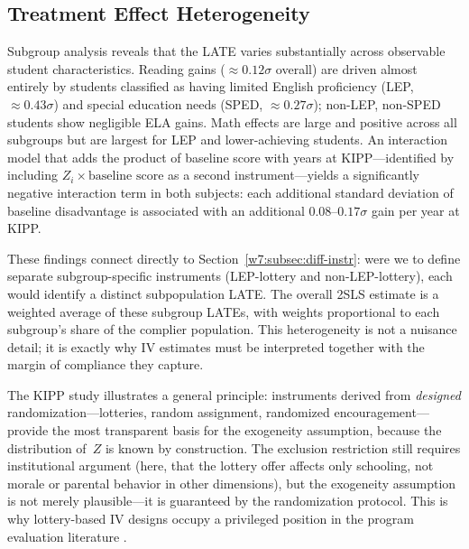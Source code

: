 \documentclass[master.tex]{subfiles}
\begin{document}
\subsection{Treatment Effect Heterogeneity}

Subgroup analysis reveals that the LATE varies substantially across
observable student characteristics.  Reading gains ($\approx 0.12\sigma$
overall) are driven almost entirely by students classified as having
limited English proficiency (LEP, $\approx 0.43\sigma$) and special
education needs (SPED, $\approx 0.27\sigma$); non-LEP, non-SPED
students show negligible ELA gains.  Math effects are large and
positive across all subgroups but are largest for LEP and
lower-achieving students.  An interaction model that adds the product
of baseline score with years at KIPP---identified by including
$Z_i \times \text{baseline score}$ as a second instrument---yields
a significantly negative interaction term in both subjects: each
additional standard deviation of baseline disadvantage is associated
with an additional $0.08$--$0.17\sigma$ gain per year at KIPP.

These findings connect directly to Section~\ref{w7:subsec:diff-instr}:
were we to define separate subgroup-specific instruments (LEP-lottery
and non-LEP-lottery), each would identify a distinct subpopulation
LATE.  The overall 2SLS estimate is a weighted average of these
subgroup LATEs, with weights proportional to each subgroup's share of
the complier population.  This heterogeneity is not a nuisance
detail; it is exactly why IV estimates must be interpreted together
with the margin of compliance they capture.

\begin{tcolorbox}[remarkstyle, title={Remark: Lottery Design and Assumption Credibility}]
The KIPP study illustrates a general principle: instruments derived
from \emph{designed} randomization---lotteries, random assignment,
randomized encouragement---provide the most transparent basis for
the exogeneity assumption, because the distribution of~$Z$ is known
by construction.  The exclusion restriction still requires
institutional argument (here, that the lottery offer affects only
schooling, not morale or parental behavior in other dimensions), but
the exogeneity assumption is not merely plausible---it is guaranteed
by the randomization protocol.  This is why lottery-based IV designs
occupy a privileged position in the program evaluation literature
\citep{angrist2009mostly}.
\end{tcolorbox}
\end{document}
